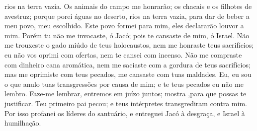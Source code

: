 {{} rios na terra vazia.
Os animais do campo me honrarão; os chacais e os filhotes de avestruz; porque porei águas no deserto, rios na terra vazia, para dar de beber a meu povo, meu escolhido.
Este povo formei para mim, eles declararão louvor a mim.
Porém tu não me invocaste, ó Jacó; pois te cansaste de mim, ó Israel.
Não me trouxeste o gado miúdo de teus holocaustos, nem me honraste
{} teus sacrifícios; eu não vos oprimi com ofertas, nem te cansei com incenso.
Não me compraste com dinheiro cana aromática, nem me saciaste com a gordura de teus sacrifícios; mas me oprimiste com teus pecados,
{} me cansaste com tuas maldades.
Eu, eu sou o que anulo tuas transgressões por causa de mim; e te teus pecados eu não me lembro.
Faze-me lembrar, entremos em juízo juntos; mostra
{} ,para que possas te justificar.
Teu primeiro pai pecou; e teus intérpretes transgrediram contra mim.
Por isso profanei os líderes do santuário, e entreguei Jacó à desgraça, e Israel à humilhação.

}
